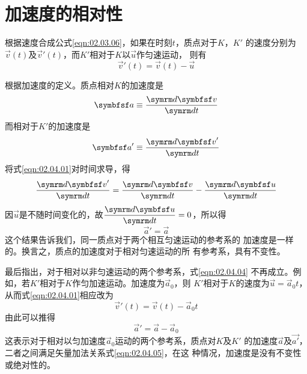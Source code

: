 \section{加速度的相对性}\label{sec:02.04}

根据速度合成公式\eqref{eqn:02.03.06}，如果在时刻$t$，质点对于$K$，$K'$
的速度分别为$\vec{v}\left(t\right)$及$\vec{v}'\left(t\right)$，而$K'$相对于$K$以$\vec{u}$作匀速运动，
则有
\begin{equation}\label{eqn:02.04.01}
  \vec{v}'\left(t\right)=\vec{v}\left(t\right)-\vec{u}
\end{equation}

\clearpage\noindent
根据加速度的定义。质点相对$K$的加速度是
\begin{equation}\label{eqn:02.04.02}
  \vec{a}\equiv\frac{\dif \vec{v}}{\dif t}
\end{equation}
而相对于$K'$的加速度是
\begin{equation}\label{eqn:02.04.03}
  \vec{a}'\equiv\frac{\dif \vec{v}'}{\dif t}
\end{equation}
将式\eqref{eqn:02.04.01}对时间求导，得
\begin{equation*}
  \frac{\dif \vec{v}'}{\dif t}=\frac{\dif \vec{v}}{\dif t}-\frac{\dif \vec{u}}{\dif t}
\end{equation*}
因$ \vec{u} $是不随时间变化的，故$\dfrac{\dif \vec{u}}{\dif t}=0$，所以得
\begin{equation}\label{eqn:02.04.04}
  \vec{a}'=\vec{a}
\end{equation}
这个结果告诉我们，同一质点对于两个相互匀速运动的参考系的
加速度是一样的。换言之，质点的加速度对于相对匀速运动的所
有参考系，具有不变性。

最后指出，对于相对以非匀速运动的两个参考系，式\eqref{eqn:02.04.04}
不再成立。例如，若$K'$相对于$K$作匀加速运动。加速度为$\vec{a}_0$，则
$K'$相对于$K$的速度为$\vec{u}=\vec{a}_0t$，从而式\eqref{eqn:02.04.01}相应改为
\begin{equation*}
  \vec{v}'\left(t\right)=\vec{v}\left(t\right)-\vec{a}_0t
\end{equation*}
由此可以推得
\begin{equation}\label{eqn:02.04.05}
  \vec{a}'=\vec{a} - \vec{a}_0
\end{equation}
这表示对于相对以匀加速度$\vec{a}_0$运动的两个参考系，质点对$K$及$K'$
的加速度$\vec{a}$及$\vec{a'}$，二者之间满足矢量加法关系\lhbrak 式\eqref{eqn:02.04.05}\rhbrak ，在这
种情况，加速度是没有不变性或绝对性的。
